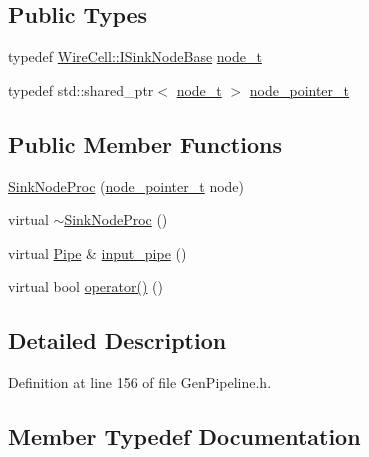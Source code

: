 \subsection*{Public Types}
\begin{DoxyCompactItemize}
\item 
typedef \hyperlink{class_wire_cell_1_1_i_sink_node_base}{Wire\+Cell\+::\+I\+Sink\+Node\+Base} \hyperlink{class_wire_cell_1_1_sink_node_proc_ae7348fd04b47ae565891a4971b894852}{node\+\_\+t}
\item 
typedef std\+::shared\+\_\+ptr$<$ \hyperlink{class_wire_cell_1_1_sink_node_proc_ae7348fd04b47ae565891a4971b894852}{node\+\_\+t} $>$ \hyperlink{class_wire_cell_1_1_sink_node_proc_a54a5858c419093b066bc8394290e0617}{node\+\_\+pointer\+\_\+t}
\end{DoxyCompactItemize}
\subsection*{Public Member Functions}
\begin{DoxyCompactItemize}
\item 
\hyperlink{class_wire_cell_1_1_sink_node_proc_ac57a7746cf4b4850adf06a071a7d53ab}{Sink\+Node\+Proc} (\hyperlink{class_wire_cell_1_1_sink_node_proc_a54a5858c419093b066bc8394290e0617}{node\+\_\+pointer\+\_\+t} node)
\item 
virtual \hyperlink{class_wire_cell_1_1_sink_node_proc_a28940b145d90dfa7fabfa1407ab617f6}{$\sim$\+Sink\+Node\+Proc} ()
\item 
virtual \hyperlink{namespace_wire_cell_afce9bb01c731347c3d4c8ca9d4ed804f}{Pipe} \& \hyperlink{class_wire_cell_1_1_sink_node_proc_a7a663013b7c3dc008f55eac98a683de3}{input\+\_\+pipe} ()
\item 
virtual bool \hyperlink{class_wire_cell_1_1_sink_node_proc_a4bc788f3ec9f7558438f8b5f61a5ca1f}{operator()} ()
\end{DoxyCompactItemize}


\subsection{Detailed Description}


Definition at line 156 of file Gen\+Pipeline.\+h.



\subsection{Member Typedef Documentation}
\mbox{\label{class_wire_cell_1_1_sink_node_proc_a54a5858c419093b066bc8394290e0617}} 
